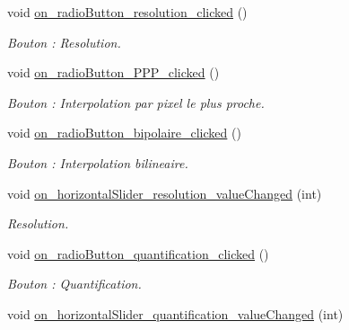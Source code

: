 \begin{DoxyCompactItemize}
void \hyperlink{classMainWindow_a89fcd1468300d25c34b6c35188e8dd52}{on\+\_\+radio\+Button\+\_\+resolution\+\_\+clicked} ()
\begin{DoxyCompactList}\small\item\em Bouton \+: Resolution. \end{DoxyCompactList}\item 
\mbox{\label{classMainWindow_a0f6b5671436b52118a5758c15a3735c2}} 
void \hyperlink{classMainWindow_a0f6b5671436b52118a5758c15a3735c2}{on\+\_\+radio\+Button\+\_\+\+P\+P\+P\+\_\+clicked} ()
\begin{DoxyCompactList}\small\item\em Bouton \+: Interpolation par pixel le plus proche. \end{DoxyCompactList}\item 
\mbox{\label{classMainWindow_a130c57540974796d0d852500b5e8bf17}} 
void \hyperlink{classMainWindow_a130c57540974796d0d852500b5e8bf17}{on\+\_\+radio\+Button\+\_\+bipolaire\+\_\+clicked} ()
\begin{DoxyCompactList}\small\item\em Bouton \+: Interpolation bilineaire. \end{DoxyCompactList}\item 
\mbox{\label{classMainWindow_afc4c7343e28265af54bd7c86454ac4c9}} 
void \hyperlink{classMainWindow_afc4c7343e28265af54bd7c86454ac4c9}{on\+\_\+horizontal\+Slider\+\_\+resolution\+\_\+value\+Changed} (int)
\begin{DoxyCompactList}\small\item\em Resolution. \end{DoxyCompactList}\item 
\mbox{\label{classMainWindow_a8cd0cb42f3c2938fed72485017821bd1}} 
void \hyperlink{classMainWindow_a8cd0cb42f3c2938fed72485017821bd1}{on\+\_\+radio\+Button\+\_\+quantification\+\_\+clicked} ()
\begin{DoxyCompactList}\small\item\em Bouton \+: Quantification. \end{DoxyCompactList}\item 
\mbox{\label{classMainWindow_ae9f62107ee0d82f6171ee9caa9aab118}} 
void \hyperlink{classMainWindow_ae9f62107ee0d82f6171ee9caa9aab118}{on\+\_\+horizontal\+Slider\+\_\+quantification\+\_\+value\+Changed} (int)

\end{DoxyCompactItemize}
